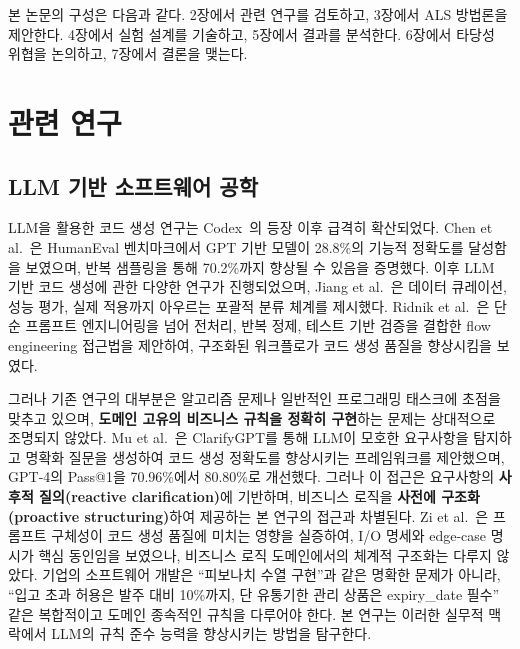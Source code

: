 \documentclass[conference]{IEEEtran}
\begin{document}
본 논문의 구성은 다음과 같다. 2장에서 관련 연구를 검토하고, 3장에서 ALS 방법론을 제안한다. 4장에서 실험 설계를 기술하고, 5장에서 결과를 분석한다. 6장에서 타당성 위협을 논의하고, 7장에서 결론을 맺는다.

\section{관련 연구}

\subsection{LLM 기반 소프트웨어 공학}

LLM을 활용한 코드 생성 연구는 Codex~\cite{chen2021evaluating}의 등장 이후 급격히 확산되었다. Chen et al.~\cite{chen2021evaluating}은 HumanEval 벤치마크에서 GPT 기반 모델이 28.8\%의 기능적 정확도를 달성함을 보였으며, 반복 샘플링을 통해 70.2\%까지 향상될 수 있음을 증명했다. 이후 LLM 기반 코드 생성에 관한 다양한 연구가 진행되었으며, Jiang et al.~\cite{jiang2024survey}은 데이터 큐레이션, 성능 평가, 실제 적용까지 아우르는 포괄적 분류 체계를 제시했다. Ridnik et al.~\cite{ridnik2024alphacodium}은 단순 프롬프트 엔지니어링을 넘어 전처리, 반복 정제, 테스트 기반 검증을 결합한 flow engineering 접근법을 제안하여, 구조화된 워크플로가 코드 생성 품질을 향상시킴을 보였다.

그러나 기존 연구의 대부분은 알고리즘 문제나 일반적인 프로그래밍 태스크에 초점을 맞추고 있으며, \textbf{도메인 고유의 비즈니스 규칙을 정확히 구현}하는 문제는 상대적으로 조명되지 않았다. Mu et al.~\cite{mu2024clarifygpt}은 ClarifyGPT를 통해 LLM이 모호한 요구사항을 탐지하고 명확화 질문을 생성하여 코드 생성 정확도를 향상시키는 프레임워크를 제안했으며, GPT-4의 Pass@1을 70.96\%에서 80.80\%로 개선했다. 그러나 이 접근은 요구사항의 \textbf{사후적 질의(reactive clarification)}에 기반하며, 비즈니스 로직을 \textbf{사전에 구조화(proactive structuring)}하여 제공하는 본 연구의 접근과 차별된다. Zi et al.~\cite{zi2025prompt}은 프롬프트 구체성이 코드 생성 품질에 미치는 영향을 실증하여, I/O 명세와 edge-case 명시가 핵심 동인임을 보였으나, 비즈니스 로직 도메인에서의 체계적 구조화는 다루지 않았다. 기업의 소프트웨어 개발은 ``피보나치 수열 구현''과 같은 명확한 문제가 아니라, ``입고 초과 허용은 발주 대비 10\%까지, 단 유통기한 관리 상품은 expiry\_date 필수'' 같은 복합적이고 도메인 종속적인 규칙을 다루어야 한다. 본 연구는 이러한 실무적 맥락에서 LLM의 규칙 준수 능력을 향상시키는 방법을 탐구한다.
\end{document}
